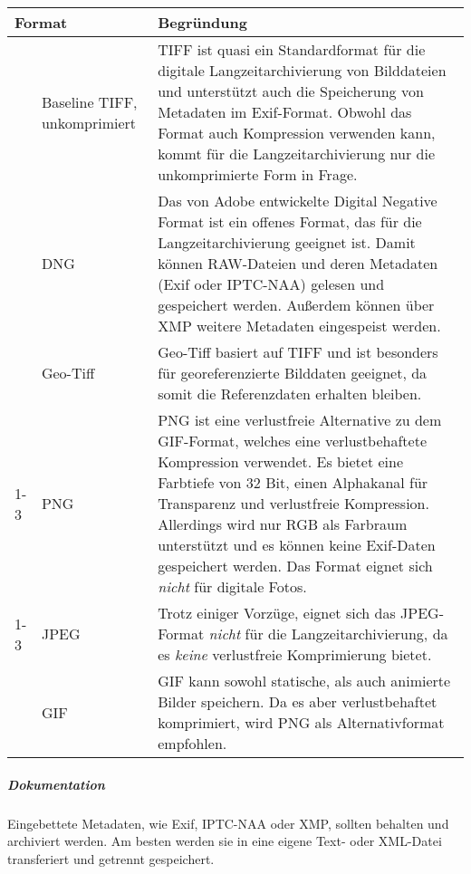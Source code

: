 \begin{center}
	\begin{tabular}{l p{} p{}}
		\toprule
		\multicolumn{2}{l}{Format} & Begründung \\ \midrule
		\multirow{3}{*}{\color{ForestGreen} \LARGE \checkmark} & Baseline TIFF, unkomprimiert & TIFF ist quasi ein Standardformat für die digitale Langzeitarchivierung von Bilddateien und unterstützt auch die Speicherung von Metadaten im Exif-Format. Obwohl das Format auch Kompression verwenden kann, kommt für die Langzeitarchivierung nur die unkomprimierte Form in Frage. \\
		  & DNG & Das von Adobe entwickelte Digital Negative Format ist ein offenes Format, das für die Langzeitarchivierung geeignet ist. Damit können RAW-Dateien und deren Metadaten (Exif oder IPTC-NAA) gelesen und gespeichert werden. Außerdem können über XMP weitere Metadaten eingespeist werden.\\ 
		  & Geo-Tiff & Geo-Tiff basiert auf TIFF und ist besonders für georeferenzierte Bilddaten geeignet, da somit die Referenzdaten erhalten bleiben.\\ \cmidrule(r){1-3}
		\multirow{1}{*}{$\color{BurntOrange} \thicksim$} & PNG & PNG ist eine verlustfreie Alternative zu dem GIF-Format, welches eine verlustbehaftete Kompression verwendet. Es bietet eine Farbtiefe von 32 Bit, einen Alphakanal für Transparenz und verlustfreie Kompression. Allerdings wird nur RGB als Farbraum unterstützt und es können keine Exif-Daten gespeichert werden. Das Format eignet sich \emph{nicht} für digitale Fotos. \\ \cmidrule(r){1-3}
		\multirow{2}{*}{\LARGE \boldmath$\color{BrickRed} \times$}& JPEG & Trotz einiger Vorzüge, eignet sich das JPEG-Format \emph{nicht} für die Langzeitarchivierung, da es \emph{keine} verlustfreie Komprimierung bietet.\\
		 & GIF & GIF kann sowohl statische, als auch animierte Bilder speichern. Da es aber verlustbehaftet komprimiert, wird PNG als Alternativformat empfohlen. \\
 		\bottomrule    
	\end{tabular}
\end{center}


\subparagraph{Dokumentation}
\label{Metadaten-Rastergrafiken} Eingebettete Metadaten, wie Exif, IPTC-NAA oder XMP, sollten behalten und archiviert werden. Am besten werden sie in eine eigene Text- oder XML-Datei transferiert und getrennt gespeichert.

